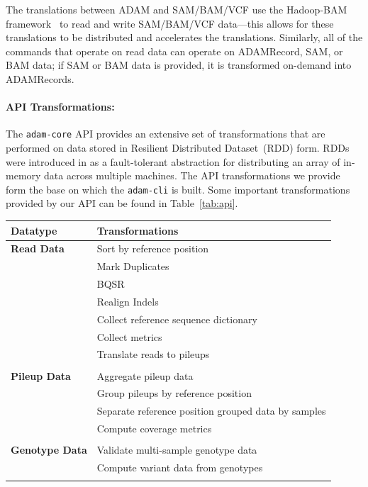 \documentclass{bioinfo}
\begin{document}
The translations between ADAM and SAM/BAM/VCF use the Hadoop-BAM framework~\citep[see][]{niemenmaa12} to read and write SAM/BAM/VCF data---this allows for these
translations to be distributed and accelerates the translations. Similarly, all of the commands that operate on read data can operate on ADAMRecord, SAM, or BAM data;
if SAM or BAM data is provided, it is transformed on-demand into ADAMRecords.

\paragraph{API Transformations:}
\label{sec:api-transforms}

The \texttt{adam-core} API provides an extensive set of transformations that are performed on data stored in Resilient Distributed Dataset~(RDD) form. RDDs were introduced
in \citet{zaharia12} as a fault-tolerant abstraction for distributing an array of in-memory data across multiple machines. The API transformations we provide form the base on
which the \texttt{adam-cli} is built. Some important transformations provided by our API can be found in Table~\ref{tab:api}.

\begin{table}[h]
{\begin{tabular}{ l l }
\toprule
\bf Datatype & \bf Transformations \\
\midrule
\bf Read Data & Sort by reference position \\
 & Mark Duplicates \\
 & BQSR \\
 & Realign Indels \\
 & Collect reference sequence dictionary \\
 & Collect metrics \\
 & Translate reads to pileups \\
 & \\
\bf Pileup Data & Aggregate pileup data \\
 & Group pileups by reference position \\
 & Separate reference position grouped data by samples \\
 & Compute coverage metrics \\
 & \\
\bf Genotype Data & Validate multi-sample genotype data \\
 & Compute variant data from genotypes \\
\botrule
\end{tabular}}{}
\end{table}
\end{document}
